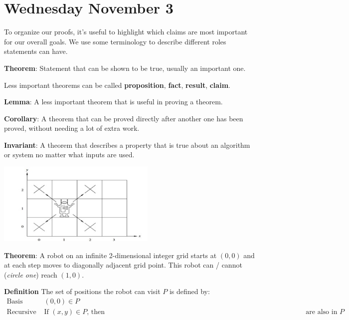 \documentclass[12pt, oneside]{article}
\begin{document}
\section*{Wednesday November 3}


To organize our proofs, it's useful to highlight which claims are most important for 
our overall goals.
We use some terminology to describe different roles statements can have.

{\bf Theorem}: Statement that can be shown to be true, usually an important one.

Less important theorems can be called {\bf proposition}, {\bf fact}, {\bf result}, {\bf claim}.

{\bf Lemma}: A less important theorem that is useful in proving a theorem.
 
{\bf Corollary}: A theorem that can be proved directly after another one has been proved, 
without needing a lot of extra work.

{\bf Invariant}: A theorem that describes a property that is true about an algorithm or 
system no matter what inputs are used.




 

\begin{center}
    \includegraphics[width=3in]{../../resources/images/robot-grid.png}
\end{center}
    
{\bf Theorem}: A robot on an infinite 2-dimensional integer grid starts at $(0,0)$ and at each step moves
to diagonally adjacent grid point. This robot can / cannot {\footnotesize({\it circle one})} reach $(1,0)$.


{\bf Definition} The set of positions the robot can visit  $P$ is defined by:
\[
\begin{array}{ll}
    \textrm{Basis Step: } & (0,0) \in P \\
    \textrm{Recursive Step: } & \textrm{If } (x,y) \in P  \textrm{, then } 
    \phantom{(x+1, y+1), (x+1, y-1), (x-1, y-1), (x-1, y+1)} \textrm{ are also in } P
\end{array}
\]
\end{document}
